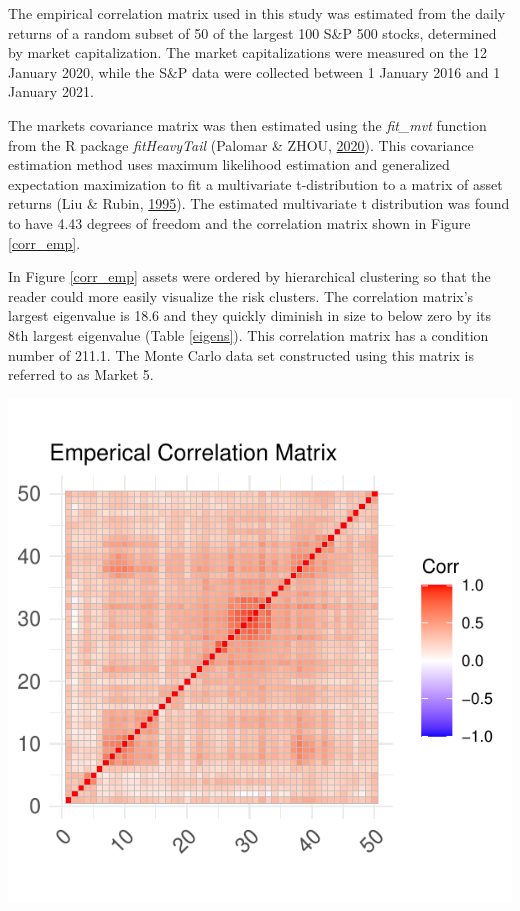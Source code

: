\documentclass[11pt,preprint, authoryear]{elsarticle}
\let\origfigure\figure
\let\endorigfigure\endfigure
\renewenvironment{figure}[1][2] {
    \expandafter\origfigure\expandafter[H]
} {
    \endorigfigure
}
\numberwithin{equation}{section}
\numberwithin{figure}{section}
\numberwithin{table}{section}
\begin{document}
The empirical correlation matrix used in this study was estimated from
the daily returns of a random subset of 50 of the largest 100 S\&P 500
stocks, determined by market capitalization. The market capitalizations
were measured on the 12 January 2020, while the S\&P data were collected
between 1 January 2016 and 1 January 2021.

The markets covariance matrix was then estimated using the
\emph{fit\_mvt} function from the R package \emph{fitHeavyTail} (Palomar
\& ZHOU, \protect\hyperlink{ref-fitHeavyTail}{2020}). This covariance
estimation method uses maximum likelihood estimation and generalized
expectation maximization to fit a multivariate t-distribution to a
matrix of asset returns (Liu \& Rubin,
\protect\hyperlink{ref-liu1995}{1995}). The estimated multivariate t
distribution was found to have 4.43 degrees of freedom and the
correlation matrix shown in Figure \ref{corr_emp}.

In Figure \ref{corr_emp} assets were ordered by hierarchical clustering
so that the reader could more easily visualize the risk clusters. The
correlation matrix's largest eigenvalue is 18.6 and they quickly
diminish in size to below zero by its 8th largest eigenvalue (Table
\ref{eigens}). This correlation matrix has a condition number of 211.1.
The Monte Carlo data set constructed using this matrix is referred to as
Market 5.

\begin{figure}
\centering
\includegraphics{Thesis_files/figure-latex/unnamed-chunk-1-1.pdf}
\caption{\label{corr_emp} Emperical Correlation Matrix}
\end{figure}
\end{document}
